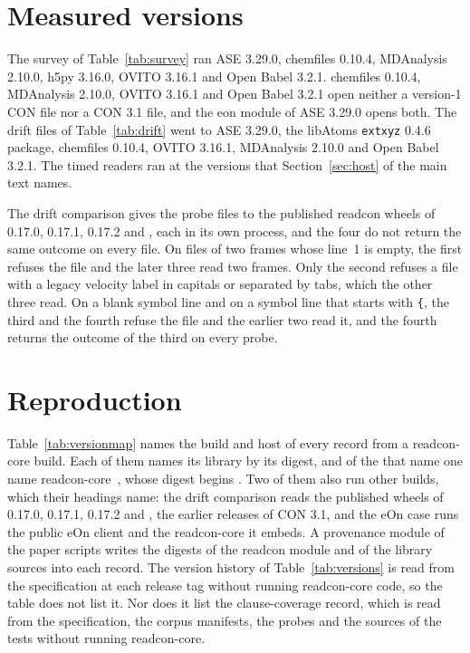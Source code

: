 \documentclass[preprint,12pt]{elsarticle}
\begin{document}
\FloatBarrier \section{Measured versions}\label{sec:supp-versions} The survey of Table~\ref{tab:survey} ran ASE 3.29.0, chemfiles 0.10.4, MDAnalysis 2.10.0, h5py 3.16.0, OVITO 3.16.1 and Open Babel 3.2.1.
chemfiles 0.10.4, MDAnalysis 2.10.0, OVITO 3.16.1 and Open Babel 3.2.1 open neither a version-1 CON file nor a CON 3.1 file, and the eon module of ASE 3.29.0 opens both.
The drift files of Table~\ref{tab:drift} went to ASE 3.29.0, the libAtoms \texttt{extxyz} 0.4.6 package, chemfiles 0.10.4, OVITO 3.16.1, MDAnalysis 2.10.0 and Open Babel 3.2.1.
The timed readers ran at the versions that Section~\ref{sec:host} of the main text names.

The drift comparison gives the probe files to the published readcon wheels of 0.17.0, 0.17.1, 0.17.2 and \rcDriftFourth{}, each in its own process, and the four do not return the same outcome on every file.
On files of two frames whose line~1 is empty, the first refuses the file and the later three read two frames.
Only the second refuses a file with a legacy velocity label in capitals or separated by tabs, which the other three read.
On a blank symbol line and on a symbol line that starts with \texttt{\{}, the third and the fourth refuse the file and the earlier two read it, and the fourth returns the outcome of the third on every probe.

\FloatBarrier \section{Reproduction}\label{sec:supp-repro} Table~\ref{tab:versionmap} names the build and host of every record from a readcon-core build.
Each of them names its library by its digest, and \rcRecordDigestCount{} of the \rcDigestRecordCount{} that name one name readcon-core~\rcRecordDigestVersion{}, whose digest begins \texttt{\rcRecordDigest}.
Two of them also run other builds, which their headings name: the drift comparison reads the published wheels of 0.17.0, 0.17.1, 0.17.2 and \rcDriftFourth{}, the earlier releases of CON 3.1, and the eOn case runs the public eOn client and the readcon-core it embeds.
A provenance module of the paper scripts writes the digests of the readcon module and of the library sources into each record.
The version history of Table~\ref{tab:versions} is read from the specification at each release tag without running readcon-core code, so the table does not list it.
Nor does it list the clause-coverage record, which is read from the specification, the corpus manifests, the probes and the sources of the tests without running readcon-core.
\end{document}
